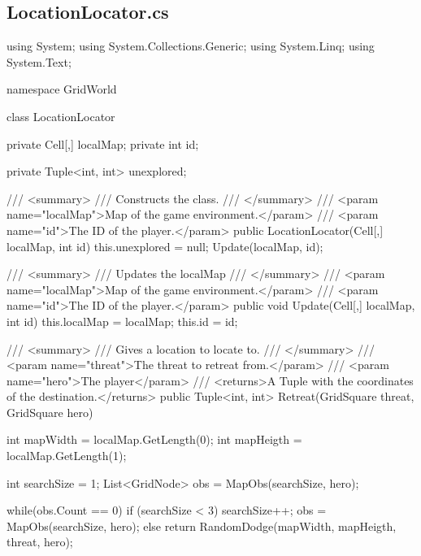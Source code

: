 \documentclass[11pt]{article}
\begin{document}
\subsection*{LocationLocator.cs}
\begin{code}
using System;
using System.Collections.Generic;
using System.Linq;
using System.Text;

namespace GridWorld
{
    class LocationLocator
    {

        private Cell[,] localMap;
        private int id;

        private Tuple<int, int> unexplored;

        /// <summary>
        /// Constructs the class.
        /// </summary>
        /// <param name="localMap">Map of the game environment.</param>
        /// <param name="id">The ID of the player.</param>
        public LocationLocator(Cell[,] localMap,  int id)
        {
            this.unexplored = null;
            Update(localMap, id);
        }

        /// <summary>
        /// Updates the localMap
        /// </summary>
        /// <param name="localMap">Map of the game environment.</param>
        /// <param name="id">The ID of the player.</param>
        public void Update(Cell[,] localMap,  int id)
        {
            this.localMap = localMap;
            this.id = id;
        }

        /// <summary>
        /// Gives a location to locate to.
        /// </summary>
        /// <param name="threat">The threat to retreat from.</param>
        /// <param name="hero">The player</param>
        /// <returns>A Tuple with the coordinates of the destination.</returns>
        public Tuple<int, int> Retreat(GridSquare threat, GridSquare hero)
        {
            int mapWidth = localMap.GetLength(0);
            int mapHeigth = localMap.GetLength(1);

            int searchSize = 1;
            List<GridNode> obs = MapObs(searchSize, hero);

            while(obs.Count == 0) 
            {
                if (searchSize < 3)
                {
                    searchSize++;
                    obs = MapObs(searchSize, hero);
                }
                else
                    return RandomDodge(mapWidth, mapHeigth, threat, hero);
            }

}}}
\end{code}
\end{document}
